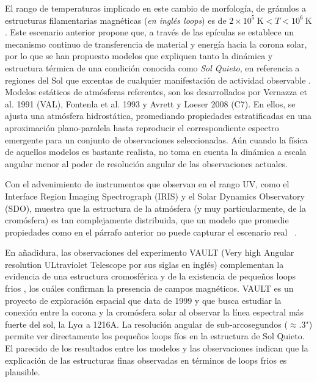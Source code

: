 
El rango de temperaturas implicado en este cambio de morfolog\'ia, de gr\'anulos a estructuras filamentarias magn\'eticas (\emph{en ingl\'es loops}) es de $2\times 10^5~\mbox{K} < T < 10^6~\mbox{K}$. Este escenario anterior propone que, a trav\'es de las ep\'iculas se establece un mecanismo continuo de transferencia de material y energ\'ia hacia la corona solar, por lo que se han propuesto modelos que expliquen tanto la din\'amica y estructura t\'ermica de una condici\'on conocida como \emph{Sol Quieto}, en referencia a regiones del Sol que excentas de cualquier manifestaci\'on de actividad observable \citep{ashwanden}. Modelos est\'aticos de atm\'osferas referentes, son los desarrollados por Vernazza et al. 1991 (VAL), Fontenla et al. 1993 y Avrett y Loeser 2008 (C7). En ellos, se ajusta una atm\'osfera hidrost\'atica, promediando propiedades estratificadas en una aproximaci\'on plano-paralela hasta reproducir el correspondiente espectro emergente para un conjunto de observaciones seleccionadas. A\'un cuando la f\'isica de aquellos modelos es bastante realista, no toma en cuenta la din\'amica a escala angular menor al poder de resoluci\'on angular de las observaciones actuales.

Con el advenimiento de instrumentos que observan en el rango UV, como el Interface Region Imaging Spectrograph (IRIS) y el Solar Dynamics Observatory (SDO), muestra que la estructura de la atm\'osfera (y muy particularmente, de la crom\'osfera) es tan complejamente distribuida, que un modelo que promedie propiedades como en el p\'arrafo anterior no puede capturar el escenario real ~\citep{VAULT1}. 

En a\~nadidura, las  observaciones del experimento VAULT (Very high Angular resolution ULtraviolet Telescope por sus siglas en ingl\'es) complementan la evidencia de una estructura cromosf\'erica y de la existencia de peque\~nos loops frios \citep{VAULT1}, los cu\'ales confirman la presencia de campos magn\'eticos.
VAULT es un proyecto de exploraci\'on espacial que data de 1999 y que busca estudiar la conexi\'on entre la corona y la crom\'osfera solar al observar la l\'inea espectral m\'as fuerte del sol, la Ly$\alpha$ a 1216A.
La resoluci\'on angular de sub-arcosegundos ($\approx$.3") permite ver directamente los peque\~nos loops f\'ios en la estructura de Sol Quieto. El parecido de los resultados entre los modelos y las observaciones indican que la explicaci\'on de las estructuras finas observadas en t\'erminos de loops frios es plausible.

